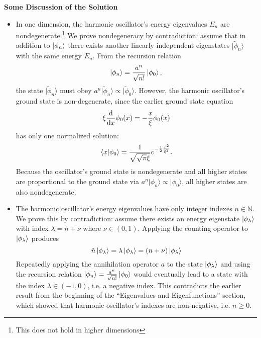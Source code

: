\documentclass[11pt, a4paper]{article}
\renewcommand{\t}[1]{\tilde{#1}}
\newcommand{\bket}[1]{\big | {#1} \big \rangle }
\renewcommand{\k}[1]{\ket{#1}}
\newcommand{\bk}[1]{\bket{#1}}
\begin{document}
\textbf{Some Discussion of the Solution}
\begin{itemize}
	\item In one dimension, the harmonic oscillator's energy eigenvalues $ E_{n} $ are nondegenerate.\footnote{This does not hold in higher dimensions} We prove nondegeneracy by contradiction: assume that in addition to $ \k{\phi_{n}} $ there exists another linearly independent eigenstates $ \bk{\t{\phi}_{n}} $ with the same energy $ E_{n} $. From the recursion relation
	\begin{equation*}
		\ket{\phi_{n}} = \frac{a^{n}}{\sqrt{n!}}\ket{\phi_{0}},
	\end{equation*}
	the state $ \bk{\t{\phi}_{n}} $ must obey $ a^{n}\bk{\t{\phi}_{n}} \propto \bk{\t{\phi}_{0}} $. However, the harmonic oscillator's ground state is non-degenerate, since the earlier ground state equation 
	\begin{equation*}
		\xi \dv{x} \phi_{0}(x) = - \frac{x}{\xi}\phi_{0}(x)
	\end{equation*}
	has only one normalized solution:
	\begin{equation*}
		\braket{x}{\phi_{0}} = \frac{1}{\sqrt{\sqrt{\pi}\xi}}e^{-\frac{1}{2}\frac{x^{2}}{\xi^{2}}}.
	\end{equation*}
	Because the oscillator's ground state is nondegenerate and all higher states are proportional to the ground state via $  a^{n}\bk{\phi_{n}} \propto \bk{\phi_{0}}  $, all higher states are also nondegenerate.
	
	\item The harmonic oscillator's energy eigenvalues have only integer indexes $ n \in \mathbb{N} $. We prove this by contradiction: assume there exists an energy eigenstate $ \k{\phi_{\lambda}} $ with index $ \lambda = n + \nu $ where $ \nu \in (0, 1) $. Applying the counting operator to $ \k{\phi_{\lambda}} $ produces
	\begin{equation*}
		\hat{n}\ket{\phi_{\lambda}} = \lambda \ket{\phi_{\lambda}} = (n + \nu)\ket{\phi_{\lambda}}
	\end{equation*}
	Repeatedly applying the annihilation operator $ a $ to the state $ \ket{\phi_{\lambda}} $ and using the recursion relation $ \ket{\phi_{n}} = \frac{a^{n}}{\sqrt{n!}}\ket{\phi_{0}} $ would eventually lead to a state with the index $ \lambda \in (-1, 0) $, i.e. a negative index. This contradicts the earlier result from the beginning of the ``Eigenvalues and Eigenfunctions'' section, which showed that harmonic oscillator's indexes are non-negative, i.e. $ n \geq 0 $. 
\end{itemize}
\end{document}
